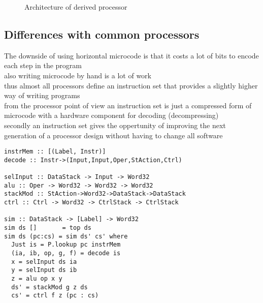 \documentclass[preprint]{sigplanconf}
\begin{document}
\begin{figure}
\caption{Architecture of derived processor}
\end{figure}

\subsection{Differences with common processors}

The downside of using horizontal microcode is that it costs a lot of bits to encode each step in the program \\
also writing microcode by hand is a lot of work \\
thus almost all processors define an instruction set that provides a slightly higher way of writing programs \\
from the processor point of view an instruction set is just a compressed form of microcode with a hardware component for decoding (decompressing) \\
secondly an instruction set gives the oppertunity of improving the next generation of a processor design without having to change all software

\begin{lstlisting}
instrMem :: [(Label, Instr)]
decode :: Instr->(Input,Input,Oper,StAction,Ctrl)

selInput :: DataStack -> Input -> Word32
alu :: Oper -> Word32 -> Word32 -> Word32
stackMod :: StAction->Word32->DataStack->DataStack
ctrl :: Ctrl -> Word32 -> CtrlStack -> CtrlStack

sim :: DataStack -> [Label] -> Word32
sim ds []       = top ds
sim ds (pc:cs) = sim ds' cs' where
  Just is = P.lookup pc instrMem
  (ia, ib, op, g, f) = decode is
  x = selInput ds ia
  y = selInput ds ib
  z = alu op x y 
  ds' = stackMod g z ds
  cs' = ctrl f z (pc : cs)

\end{lstlisting}
\end{document}
